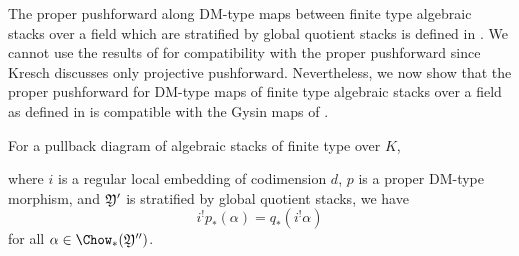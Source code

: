 The proper pushforward along DM-type maps between finite type algebraic stacks over a field which are stratified by global quotient stacks is defined in  \cite[Appendix B]{BaeSchmitt1}.  We cannot use the results of \cite{Kresch1999Cycle-groups-fo} for  compatibility with the proper  pushforward
since Kresch discusses only projective pushforward.
Nevertheless, we now show that the proper pushforward for DM-type maps of finite type algebraic stacks over a field as defined in \cite[Appendix B]{BaeSchmitt1} is compatible with the Gysin maps of \cite{Kresch1999Cycle-groups-fo}.


\begin{proposition}
\notready\label{prop:Gysinproperpush}
 For a pullback diagram of algebraic stacks of finite type over $K$,


 where $i$ is a regular local embedding of codimension $d$, $p$ is a proper DM-type morphism, and $\frak Y'$ is stratified by global quotient stacks, we have
 \[i^!p_*(\alpha) = q_* (i^! \alpha)\]
 for all  $\alpha \in \Chow_*(\frak Y'')$.
\end{proposition}

